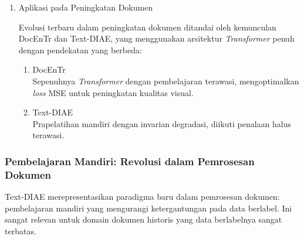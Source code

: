 \documentclass[12pt,a4paper]{article}
\begin{document}
\begin{enumerate}[leftmargin=*, labelindent=0pt, itemsep=1ex, topsep=0pt]

\item Aplikasi pada Peningkatan Dokumen

Evolusi terbaru dalam peningkatan dokumen ditandai oleh kemunculan DocEnTr dan Text-DIAE, yang menggunakan arsitektur \textit{Transformer} penuh dengan pendekatan yang berbeda:
\begin{enumerate}[leftmargin=1.5em, labelsep=0.5em, itemindent=0pt, label=\alph*., topsep=0pt, parsep=0pt, itemsep=0pt]
      \item DocEnTr \mbox{}\\[0.1em]
            Sepenuhnya \textit{Transformer} dengan pembelajaran terawasi, mengoptimalkan \textit{loss} MSE untuk peningkatan kualitas visual.
      \item Text-DIAE \mbox{}\\[0.1em]
            Prapelatihan mandiri dengan invarian degradasi, diikuti penalaan halus terawasi.
\end{enumerate}

\end{enumerate}

\subsubsection{Pembelajaran Mandiri: Revolusi dalam Pemrosesan Dokumen}
\label{subsubsec:pembelajaran-mandiri}

Text-DIAE merepresentasikan paradigma baru dalam pemrosesan dokumen: pembelajaran mandiri yang mengurangi ketergantungan pada data berlabel. Ini sangat relevan untuk domain dokumen historis yang data berlabelnya sangat terbatas.
\end{document}
